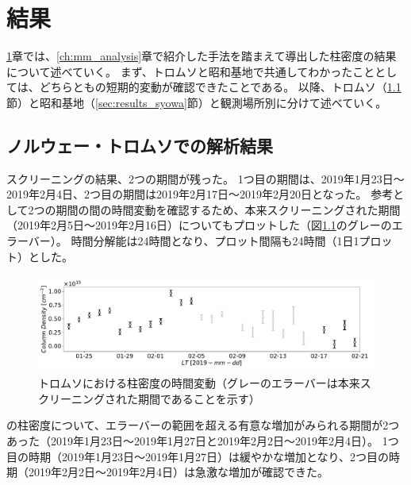 \chapter{結果}
\label{ch:results}
\ref{ch:results}章では、\ref{ch:mm_analysis}章で紹介した手法を踏まえて導出した柱密度の結果について述べていく。
まず、トロムソと昭和基地で共通してわかったこととしては、どちらともの短期的変動が確認できたことである。
以降、トロムソ（\ref{sec:results_tromsoe}節）と昭和基地（\ref{sec:results_syowa}節）と観測場所別に分けて述べていく。

\section{ノルウェー・トロムソでの解析結果}
\label{sec:results_tromsoe}
スクリーニングの結果、2つの期間が残った。
1つ目の期間は、2019年1月23日〜2019年2月4日、2つ目の期間は2019年2月17日〜2019年2月20日となった。
参考として2つの期間の間の時間変動を確認するため、本来スクリーニングされた期間（2019年2月5日〜2019年2月16日）についてもプロットした（図\ref{fig:avg_ColumnDensity_tromsoe}のグレーのエラーバー）。
時間分解能は24時間となり、プロット間隔も24時間（1日1プロット）とした。
\begin{figure}[htbp]
    \centering
    \includegraphics[width=\linewidth]{master_thesis_contents/master_thesis_fig/avg_ColumnDensity_tromsoe.pdf}
    \caption{トロムソにおける柱密度の時間変動（グレーのエラーバーは本来スクリーニングされた期間であることを示す）}
    \label{fig:avg_ColumnDensity_tromsoe}
\end{figure}
の柱密度について、エラーバーの範囲を超える有意な増加がみられる期間が2つあった（2019年1月23日〜2019年1月27日と2019年2月2日〜2019年2月4日）。
1つ目の時期（2019年1月23日〜2019年1月27日）は緩やかな増加となり、2つ目の時期（2019年2月2日〜2019年2月4日）は急激な増加が確認できた。


